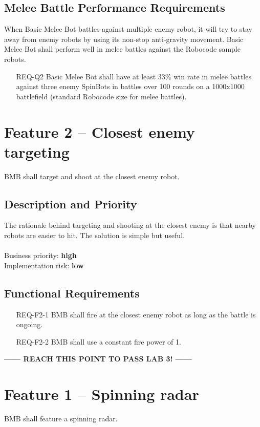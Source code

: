 \documentclass{scrreprt}
\begin{document}
\subsection{Melee Battle Performance Requirements}
When Basic Melee Bot battles against multiple enemy robot, it will try to stay away from enemy robots by using its non-stop anti-gravity movement. Basic Melee Bot shall perform well in melee battles against the Robocode sample robots.

\begin{itemize}
\item[REQ-Q2] Basic Melee Bot shall have at least 33\% win rate in melee battles against three enemy SpinBots in battles over 100 rounds on a 1000x1000 battlefield (standard Robocode size for melee battles).
\end{itemize}

\section{Feature 2 -- Closest enemy targeting}
BMB shall target and shoot at the closest enemy robot.

\subsection{Description and Priority}
The rationale behind targeting and shooting at the closest enemy is that nearby robots are easier to hit. The solution is simple but useful.\\\\Business priority: \textbf{high}\\
Implementation risk: \textbf{low}

\subsection{Functional Requirements}
\begin{itemize}
\item[REQ-F2-1] BMB shall fire at the closest enemy robot as long as the battle is ongoing.
\item[REQ-F2-2] BMB shall use a constant fire power of 1.
\end{itemize}

\begin{center}
\textbf{------ REACH THIS POINT TO PASS LAB 3! ------}
\end{center}

\section{Feature 1 -- Spinning radar}
BMB shall feature a spinning radar.
\end{document}
